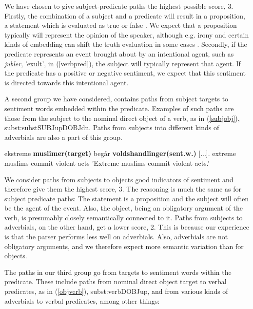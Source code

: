 \documentclass[11pt]{article}
\begin{document}
	We have chosen to give subject-predicate paths the highest possible score, 3. Firstly, the combination of a subject and a predicate will result in a proposition, a statement which is evaluated as true or false \cite{Heim98}. We expect that a proposition typically will represent the opinion of the speaker, although e.g. irony and certain kinds of embedding can shift the truth evaluation in some cases \cite{Hooper73}. Secondly, if the predicate represents an event brought about by an intentional agent, such as \emph{jubler}, 'exult', in (\ref{verbpred}), the subject will typically represent that agent. If the predicate has a positive or negative sentiment, we expect that this sentiment is directed towards this intentional agent. 
	
	A second group we have considered, contains paths from subject targets to sentiment words embedded within the predicate. Examples of such paths are those from the subject to the nominal direct object of a verb, as in (\ref{subjobj}), subst:subst{\textunderscore}{\textunderscore}SUBJ{\textunderscore}up{\textunderscore}{\textunderscore}DOBJ{\textunderscore}dn. Paths from subjects into different kinds of adverbials are also a part of this group.
	
	\begin{examples}
	\item\label{subjobj}
	\gll [...] ekstreme \textbf{muslimer(target)} beg{\aa}r \textbf{voldshandlinger(sent.w.)} [...].
	{} extreme muslims commit {violent acts} {}
	\glt 'Extreme muslims commit violent acts.'
	\glend
	\end{examples}
	
	We consider paths from subjects to objects good indicators of sentiment and therefore give them the highest score, 3. The reasoning is much the same as for subject predicate paths: The statement is a proposition and the subject will often be the agent of the event. Also, the object, being an obligatory argument of the verb, is presumably closely semantically connected to it. Paths from subjects to adverbials, on the other hand, get a lower score, 2. This is because our experience is that the parser performs less well on adverbials. Also, adverbials are not obligatory arguments, and we therefore expect more semantic variation than for objects.
	
	The paths in our third group go from targets to sentiment words within the predicate. These include paths from nominal direct object target to verbal predicates, as in (\ref{objverb}), subst:verb{\textunderscore}{\textunderscore}DOBJ{\textunderscore}up, and from various kinds of adverbials to verbal predicates, among other things:
	
\end{document}

